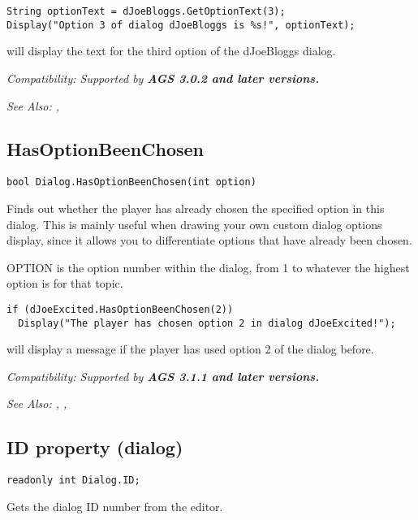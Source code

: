 \begin{verbatim}
String optionText = dJoeBloggs.GetOptionText(3);
Display("Option 3 of dialog dJoeBloggs is %s!", optionText);
\end{verbatim}
will display the text for the third option of the dJoeBloggs dialog.

\it{Compatibility:} Supported by \bf{AGS 3.0.2} and later versions.

\it{See Also:} ,


\subsection{HasOptionBeenChosen}\label{Dialog.HasOptionBeenChosen}%

\begin{verbatim}
bool Dialog.HasOptionBeenChosen(int option)
\end{verbatim}
Finds out whether the player has already chosen the specified option in this
dialog. This is mainly useful when drawing your own custom dialog options
display, since it allows you to differentiate options that have already been chosen.

OPTION is the option number within the dialog, from 1 to whatever the
highest option is for that topic.

\begin{verbatim}
if (dJoeExcited.HasOptionBeenChosen(2))
  Display("The player has chosen option 2 in dialog dJoeExcited!");
\end{verbatim}
will display a message if the player has used option 2 of the dialog before.

\it{Compatibility:} Supported by \bf{AGS 3.1.1} and later versions.

\it{See Also:} ,
,


\subsection{ID property (dialog)}\label{Dialog.ID}%

\begin{verbatim}
readonly int Dialog.ID;
\end{verbatim}
Gets the dialog ID number from the editor.

